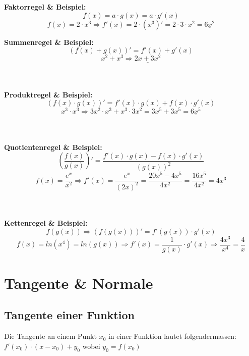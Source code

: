 \documentclass[12pt]{scrartcl}
\begin{document}
\begin{center}
\textbf{Faktorregel \& Beispiel:} 
\[ f(x) = a \cdot g(x) = a \cdot g'(x)\]
\[f(x)=2 \cdot x^3 \Rightarrow f'(x)=2 \cdot (x^3)' = 2 \cdot 3 \cdot x^2 = \underline{6x^2}\]

\textbf{Summenregel \& Beispiel:} 
\[ (f(x) + g(x))' = f'(x) + g'(x) \]
\[ x^2 + x^3 \Rightarrow \underline{2x + 3x^2}\]

\hspace{0pt} \\
\hspace{0pt} \\
\noindent
\textbf{Produktregel \& Beispiel:} 
\[ (f(x) \cdot g(x))' =  f'(x) \cdot g(x) + f(x) \cdot g'(x)\]
\[x^3 \cdot x^3 \Rightarrow 3x^2 \cdot x^3 + x^3 \cdot 3x^2 = 3x^5 + 3x^5 = \underline{6x^5}\]


\hspace{0pt} \\
\hspace{0pt} \\
\noindent
\textbf{Quotientenregel \& Beispiel:} 
\[\left(\frac{f(x)}{g(x)}\right)' = \frac{f'(x) \cdot g(x) - f(x) \cdot g'(x)}{(g(x))^2}\]
\[f(x)= \frac{e^x}{x^2} \Rightarrow f'(x) = \frac{e^x}{(2x)^2} = \frac{20x^5 - 4x^5}{4x^2} = \frac{16x^5}{4x^2} = \underline{4x^3}\]

\hspace{0pt} \\
\hspace{0pt} \\
\noindent
\textbf{Kettenregel \& Beispiel:} 
\[f(g(x)) \Rightarrow (f(g(x)))' = f'(g(x)) \cdot g'(x)\]
\[f(x) = ln(x^4) = ln(g(x)) \Rightarrow f'(x) = \frac{1}{g(x)} \cdot g'(x) \Rightarrow \frac{4x^3}{x^4} = \frac{4}{x}\]


\end{center}

\newpage

\section{Tangente \& Normale}
\subsection{Tangente einer Funktion}
Die Tangente an einem Punkt $x_0$ in einer Funktion lautet folgendermassen:\\
$ f'(x_0) \cdot (x - x_0) + y_0$ wobei $y_0 = f(x_0)$\\
\end{document}
